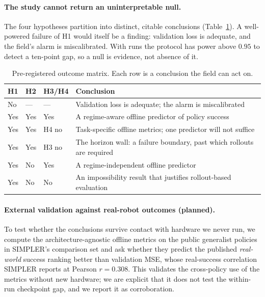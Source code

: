 \paragraph{The study cannot return an uninterpretable null.} The four hypotheses partition
into distinct, citable conclusions (Table~\ref{tab:outcome}). A well-powered failure of H1
would itself be a finding: validation loss is adequate, and the field's alarm is miscalibrated.
With \NRuns{} runs the protocol has power above $0.95$ to detect a ten-point gap, so a null is
evidence, not absence of it.

\begin{table}[t]\centering\small
\caption{Pre-registered outcome matrix. Each row is a conclusion the field can act on.}
\label{tab:outcome}
\begin{tabular}{llll}
\toprule
H1 & H2 & H3/H4 & Conclusion \\
\midrule
No  & ---  & ---    & Validation loss is adequate; the alarm is miscalibrated \\
Yes & Yes  & Yes    & A regime-aware offline predictor of policy success \\
Yes & Yes  & H4 no  & Task-specific offline metrics; one predictor will not suffice \\
Yes & Yes  & H3 no  & The horizon wall: a failure boundary, past which rollouts are required \\
Yes & No   & Yes    & A regime-independent offline predictor \\
Yes & No   & No     & An impossibility result that justifies rollout-based evaluation \\
\bottomrule
\end{tabular}
\end{table}

\paragraph{External validation against real-robot outcomes (planned).} To test whether the
conclusions survive contact with hardware we never run, we compute the architecture-agnostic
offline metrics on the public generalist policies in SIMPLER's comparison set and ask whether
they predict the published \emph{real-world} success ranking better than validation MSE, whose
real-success correlation SIMPLER reports at Pearson $r = 0.308$. This validates the
cross-policy use of the metrics without new hardware; we are explicit that it does not test the
within-run checkpoint gap, and we report it as corroboration.
